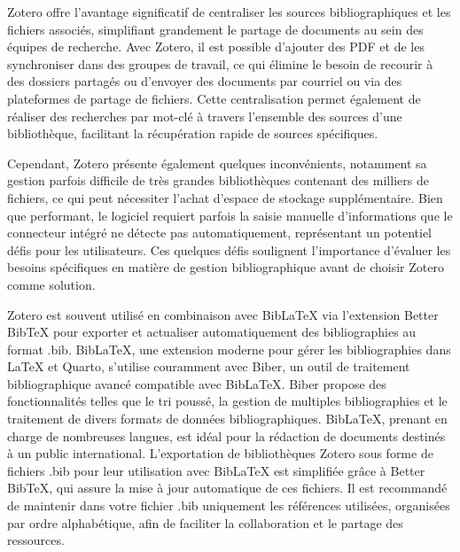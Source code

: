 \documentclass[
  letterpaper,
  DIV=11,
  numbers=noendperiod]{scrreprt}
\begin{document}
Zotero offre l'avantage significatif de centraliser les sources
bibliographiques et les fichiers associés, simplifiant grandement le
partage de documents au sein des équipes de recherche. Avec Zotero, il
est possible d'ajouter des PDF et de les synchroniser dans des groupes
de travail, ce qui élimine le besoin de recourir à des dossiers partagés
ou d'envoyer des documents par courriel ou via des plateformes de
partage de fichiers. Cette centralisation permet également de réaliser
des recherches par mot-clé à travers l'ensemble des sources d'une
bibliothèque, facilitant la récupération rapide de sources spécifiques.

Cependant, Zotero présente également quelques inconvénients, notamment
sa gestion parfois difficile de très grandes bibliothèques contenant des
milliers de fichiers, ce qui peut nécessiter l'achat d'espace de
stockage supplémentaire. Bien que performant, le logiciel requiert
parfois la saisie manuelle d'informations que le connecteur intégré ne
détecte pas automatiquement, représentant un potentiel défis pour les
utilisateurs. Ces quelques défis soulignent l'importance d'évaluer les
besoins spécifiques en matière de gestion bibliographique avant de
choisir Zotero comme solution.

Zotero est souvent utilisé en combinaison avec BibLaTeX via l'extension
Better BibTeX pour exporter et actualiser automatiquement des
bibliographies au format .bib. BibLaTeX, une extension moderne pour
gérer les bibliographies dans LaTeX et Quarto, s'utilise couramment avec
Biber, un outil de traitement bibliographique avancé compatible avec
BibLaTeX. Biber propose des fonctionnalités telles que le tri poussé, la
gestion de multiples bibliographies et le traitement de divers formats
de données bibliographiques. BibLaTeX, prenant en charge de nombreuses
langues, est idéal pour la rédaction de documents destinés à un public
international. L'exportation de bibliothèques Zotero sous forme de
fichiers .bib pour leur utilisation avec BibLaTeX est simplifiée grâce à
Better BibTeX, qui assure la mise à jour automatique de ces fichiers. Il
est recommandé de maintenir dans votre fichier .bib uniquement les
références utilisées, organisées par ordre alphabétique, afin de
faciliter la collaboration et le partage des ressources.
\end{document}
